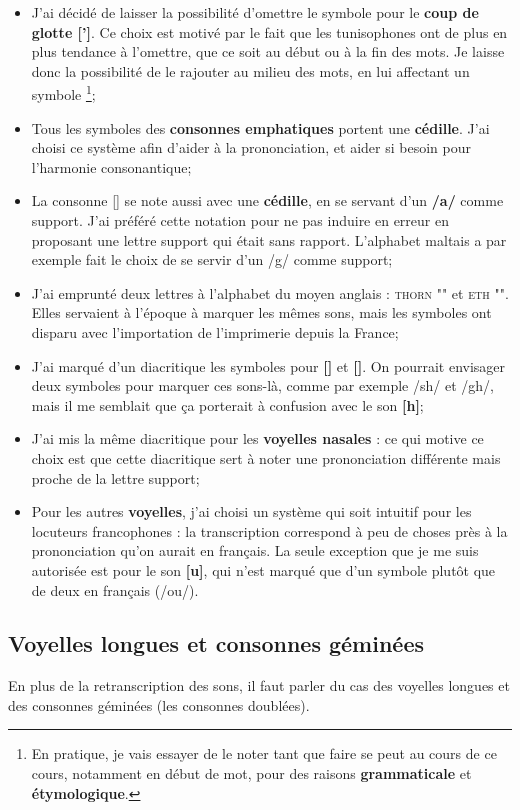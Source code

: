 \begin{itemize}
    \item J'ai décidé de laisser la possibilité d'omettre le symbole pour le \textbf{coup de glotte [']}. Ce choix est motivé par le fait que les tunisophones ont de plus en plus tendance à l'omettre, que ce soit au début ou à la fin des mots. Je laisse donc la possibilité de le rajouter au milieu des mots, en lui affectant un symbole \footnote{En pratique, je vais essayer de le noter tant que faire se peut au cours de ce cours, notamment en début de mot, pour des raisons \textbf{grammaticale} et \textbf{étymologique}.};
    \item Tous les symboles des \textbf{consonnes emphatiques} portent une \textbf{cédille}. J'ai choisi ce système afin d'aider à la prononciation, et aider si besoin pour l'harmonie consonantique;
    \item La consonne [\textrevglotstop] se note aussi avec une \textbf{cédille}, en se servant d'un \textbf{/a/} comme support. J'ai préféré cette notation pour ne pas induire en erreur en proposant une lettre support qui était sans rapport. L'alphabet maltais a par exemple fait le choix de se servir d'un /g/ comme support;
    \item J'ai emprunté deux lettres à l'alphabet du moyen anglais : \textsc{thorn} "\textbf{\th}" et \textsc{eth} "\textbf{\dh}". Elles servaient à l'époque à marquer les mêmes sons, mais les symboles ont disparu avec l'importation de l'imprimerie depuis la France;
    \item J'ai marqué d'un diacritique les symboles pour \textbf{[\textesh]} et \textbf{[\textinvscr]}. On pourrait envisager deux symboles pour marquer ces sons-là, comme par exemple /sh/ et /gh/, mais il me semblait que ça porterait à confusion avec le son \textbf{[h]};
    \item J'ai mis la même diacritique pour les \textbf{voyelles nasales} : ce qui motive ce choix est que cette diacritique sert à noter une prononciation différente mais proche de la lettre support;
    \item Pour les autres \textbf{voyelles}, j'ai choisi un système qui soit intuitif pour les locuteurs francophones : la transcription correspond à peu de choses près à la prononciation qu'on aurait en français. La seule exception que je me suis autorisée est pour le son \textbf{[u]}, qui n'est marqué que d'un symbole plutôt que de deux en français (/ou/).
\end{itemize}

\subsection{Voyelles longues et consonnes géminées}
En plus de la retranscription des sons, il faut parler du cas des voyelles longues et des consonnes géminées (les consonnes doublées).

